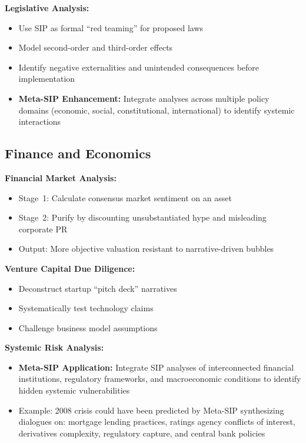 \documentclass[11pt,a4paper]{article}
\begin{document}
\textbf{Legislative Analysis:}
\begin{itemize}[nosep]
    \item Use SIP as formal ``red teaming'' for proposed laws
    \item Model second-order and third-order effects
    \item Identify negative externalities and unintended consequences before implementation
    \item \textbf{Meta-SIP Enhancement:} Integrate analyses across multiple policy domains (economic, social, constitutional, international) to identify systemic interactions
\end{itemize}

\subsection{Finance and Economics}

\textbf{Financial Market Analysis:}
\begin{itemize}[nosep]
    \item Stage~1: Calculate consensus market sentiment on an asset
    \item Stage~2: Purify by discounting unsubstantiated hype and misleading corporate PR
    \item Output: More objective valuation resistant to narrative-driven bubbles
\end{itemize}

\textbf{Venture Capital Due Diligence:}
\begin{itemize}[nosep]
    \item Deconstruct startup ``pitch deck'' narratives
    \item Systematically test technology claims
    \item Challenge business model assumptions
\end{itemize}

\textbf{Systemic Risk Analysis:}
\begin{itemize}[nosep]
    \item \textbf{Meta-SIP Application:} Integrate SIP analyses of interconnected financial institutions, regulatory frameworks, and macroeconomic conditions to identify hidden systemic vulnerabilities
    \item Example: 2008 crisis could have been predicted by Meta-SIP synthesizing dialogues on: mortgage lending practices, ratings agency conflicts of interest, derivatives complexity, regulatory capture, and central bank policies
\end{itemize}
\end{document}
